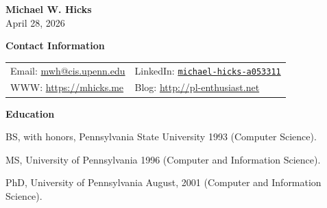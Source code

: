 \documentclass[11pt]{article}
\begin{document}
\newcommand{\papertitle}[1]{\textbf{#1}}

\begin{center}
{\LARGE\bf Michael W. Hicks}
\\
April 28, 2026\\
\end{center}

\begin{description}
\setlength{\labelsep}{0ex}
\setlength{\itemsep}{-0.5ex}

\item {\bf{\textsf Contact Information}}

\item

  \begin{tabular}{p{}p{}} 
Email: \url{mwh@cis.upenn.edu} 
& LinkedIn: \href{https://www.linkedin.com/in/michael-hicks-a053311/}{\texttt{michael-hicks-a053311}}\\
WWW: \url{https://mhicks.me}
    & Blog: \url{http://pl-enthusiast.net} \\
\end{tabular}

\end{description}

\begin{description}
\setlength{\labelsep}{0ex}
\setlength{\itemsep}{-0.5ex}

\item {\bf\textsf Education} 

\item BS, with honors, Pennsylvania State University 1993 (Computer
  Science).  
\item MS, University of Pennsylvania 1996 (Computer and
  Information Science).
\item PhD, University of Pennsylvania August, 2001 (Computer and
  Information Science).

\end{description}
\end{document}

